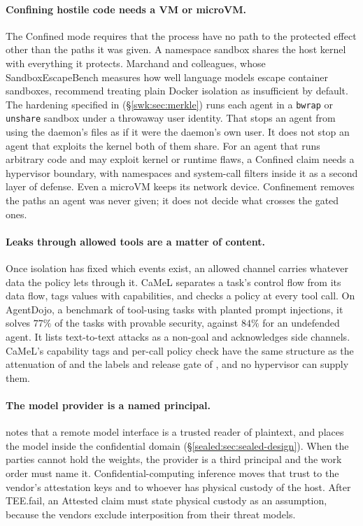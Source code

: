 \paragraph{Confining hostile code needs a VM or microVM.}
The Confined mode requires that the process have no path to the protected
effect other than the paths it was given. A namespace sandbox shares the host
kernel with everything it protects. Marchand and colleagues, whose
SandboxEscapeBench measures how well language models escape container
sandboxes, recommend treating plain Docker isolation as insufficient by
default. The
hardening specified in 
(\S\ref{swk:sec:merkle}) runs each agent in a \texttt{bwrap} or
\texttt{unshare} sandbox under a throwaway user identity. That stops an agent
from using the daemon's files as if it were the daemon's own user. It does not
stop an agent that exploits the kernel both of them share. For an agent that
runs arbitrary code and may exploit kernel or runtime flaws, a Confined claim
needs a hypervisor boundary, with namespaces and system-call filters inside it
as a second layer of defense. Even a microVM keeps its network device.
Confinement removes the paths an agent was never given; it does not decide
what crosses the gated ones.

\paragraph{Leaks through allowed tools are a matter of content.}
Once isolation has fixed which events exist, an allowed channel carries
whatever data the policy lets through it. CaMeL separates a task's control
flow from its data flow, tags values with capabilities, and checks a policy at
every tool call. On AgentDojo, a benchmark of tool-using tasks with planted
prompt injections, it solves $77\%$ of the tasks with provable security,
against $84\%$ for an undefended agent. It lists text-to-text
attacks as a non-goal and acknowledges side channels. CaMeL's capability tags and
per-call policy check have the same structure as the attenuation of
 and the labels and release gate of
, and no hypervisor can supply them.

\paragraph{The model provider is a named principal.}
 notes that a remote model interface is a
trusted reader of plaintext, and places the model inside the confidential
domain (\S\ref{sealed:sec:sealed-design}). When the parties cannot hold the
weights, the provider is a third principal and the work order must name it.
Confidential-computing inference moves that trust to the vendor's attestation
keys and to whoever has physical custody of the host. After TEE.fail, an
Attested claim must state physical custody as an assumption, because the
vendors exclude interposition from their threat models.

